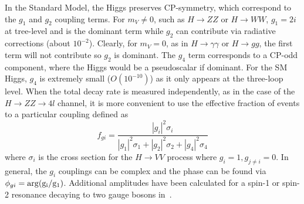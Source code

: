 In the Standard Model, the Higgs preserves CP-symmetry, which correspond to the $g_1$ and $g_2$ coupling terms. For $m_V \neq 0$, such as $H\rightarrow ZZ$ or $H\rightarrow WW$, $g_1=2i$ at tree-level and is the dominant term while $g_2$ can contribute via radiative corrections (about $10^{-2}$). Clearly, for $m_V=0$, as in $H\rightarrow\gamma\gamma$ or $H\rightarrow gg$, the first term will not contribute so $g_2$ is dominant. The $g_4$ term corresponds to a CP-odd component, where the Higgs would be a pseudoscalar if dominant. For the SM Higgs, $g_4$ is extremely small ($O(10^{-10})$) as it only appears at the three-loop level. When the total decay rate is measured independently, as in the case of the $H\rightarrow ZZ \rightarrow 4l$ channel, it is more convenient to use the effective fraction of events to a particular coupling defined as
\begin{equation}
f_{gi} = \frac{|g_i|^2\sigma_i}{|g_1|^2\sigma_1 + |g_2|^2\sigma_2 + |g_4|^2\sigma_4}
\label{eqn:fgi_eqn}
\end{equation}
where $\sigma_i$ is the cross section for the $H\rightarrow VV$ process where $g_i=1,g_{j\neq i}=0$. In general, the $g_i$ couplings can be complex and the phase can be found via $\phi_{gi}=\rm{arg}{(g_i/g_1)}$. Additional amplitudes have been calculated for a spin-1 or spin-2 resonance decaying to two gauge bosons in~\cite{}.

